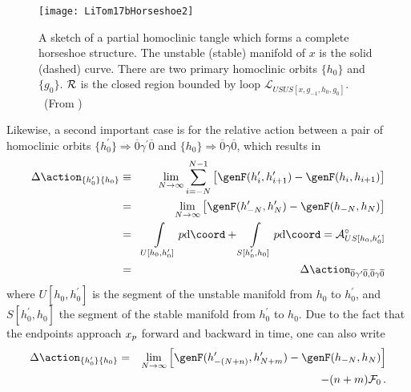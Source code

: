 \begin{figure}
   \texttt{[image: LiTom17bHorseshoe2]}
\caption{\label{fig:Horseshoe2}
A sketch of a partial homoclinic tangle
which forms a complete horseshoe structure. The unstable (stable)
manifold of $x$ is the solid (dashed) curve. There are two primary
homoclinic orbits $\lbrace h_0\rbrace$ and $\lbrace g_0\rbrace$.
$\cal{R}$ is the closed region bounded by loop
$\mathcal{L}_{USUS[x,g_{-1},h_0,g_0]}$.
~(From )
        }
\end{figure}

Likewise, a second important case is for the relative action between a
pair of homoclinic orbits $\lbrace h^{\prime}_0\rbrace \Rightarrow
\overline{0} \gamma^{\prime} \overline{0} $ and $\lbrace h_0\rbrace
\Rightarrow \overline{0} \gamma \overline{0}$, which results in
\begin{eqnarray}
\label{eq:homoclinic action difference}
\Delta \action_{{\lbrace h^{\prime}_0\rbrace}{\lbrace h_0\rbrace}} &\equiv & \lim_{N \to \infty} \sum_{i=-N}^{N-1}\left[ \genF(h^{\prime}_{i},h^{\prime}_{i+1}) - \genF(h_{i},h_{i+1})\right] \nonumber \\
& = & \lim_{N \to \infty} \left[ \genF(h^{\prime}_{-N},h^{\prime}_{N}) - \genF(h_{-N},h_{N}) \right] \nonumber \\
& = & \int\limits_{U[h_{0},h^\prime_{0}]}p\mathrm{d}\coord+\int\limits_{S[h^\prime_{0},h_{0}]}p\mathrm{d}\coord =  {\cal A}^\circ_{US[h_0,h^\prime_{0}]} \nonumber \\
& = & \Delta \action_{ \overline{0} \gamma^{\prime} \overline{0},  \overline{0} \gamma \overline{0} }
\end{eqnarray}
where $U[h_{0},h^\prime_{0}]$ is the segment of the unstable manifold
from $h_{0}$ to $h^\prime_{0}$, and $S[h^\prime_{0},h_{0}]$ the segment
of the stable manifold from $h^\prime_{0}$ to $h_{0}$.  Due to the fact
that the endpoints approach $x_p$ forward and backward in time, one can
also write
\begin{eqnarray}
\label{eq:homoclinic action difference2}
\Delta \action_{{\lbrace h^{\prime}_0\rbrace}{\lbrace h_0\rbrace}}
& = & \lim_{N \to \infty}
\left[ \genF(h^{\prime}_{-(N+n)},h^{\prime}_{N+m}) - \genF(h_{-N},h_{N})
      \right] \nonumber \\
& & - (n+m) {\cal F}_0
\,.
\end{eqnarray}

    \ifblog
\newpage


\printbibliography[heading=subbibintoc,title={References}]

\ChapterEnd
    \fi

